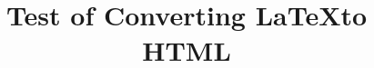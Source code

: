 \documentclass{article}
\title{Test of Converting \LaTeX to HTML}
\begin{document}
\maketitle

\blindmathpaper
\end{document}
